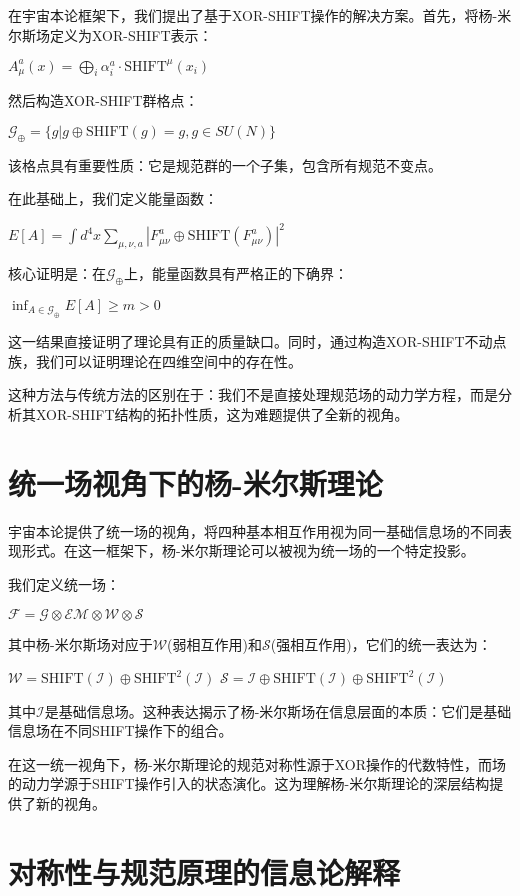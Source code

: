 在宇宙本论框架下，我们提出了基于XOR-SHIFT操作的解决方案。首先，将杨-米尔斯场定义为XOR-SHIFT表示：

$A_{\mu}^a(x) = \bigoplus_{i} \alpha_i^a \cdot \text{SHIFT}^{\mu}(x_i)$

然后构造XOR-SHIFT群格点：

$\mathcal{G}_{\oplus} = \{g | g \oplus \text{SHIFT}(g) = g, g \in SU(N)\}$

该格点具有重要性质：它是规范群的一个子集，包含所有规范不变点。

在此基础上，我们定义能量函数：

$E[A] = \int d^4x \sum_{\mu,\nu,a} |F_{\mu\nu}^a \oplus \text{SHIFT}(F_{\mu\nu}^a)|^2$

核心证明是：在$\mathcal{G}_{\oplus}$上，能量函数具有严格正的下确界：

$\inf_{A \in \mathcal{G}_{\oplus}} E[A] \geq m > 0$

这一结果直接证明了理论具有正的质量缺口。同时，通过构造XOR-SHIFT不动点族，我们可以证明理论在四维空间中的存在性。

这种方法与传统方法的区别在于：我们不是直接处理规范场的动力学方程，而是分析其XOR-SHIFT结构的拓扑性质，这为难题提供了全新的视角。

\section{统一场视角下的杨-米尔斯理论}

宇宙本论提供了统一场的视角，将四种基本相互作用视为同一基础信息场的不同表现形式。在这一框架下，杨-米尔斯理论可以被视为统一场的一个特定投影。

我们定义统一场：

$\mathcal{F} = \mathcal{G} \otimes \mathcal{EM} \otimes \mathcal{W} \otimes \mathcal{S}$

其中杨-米尔斯场对应于$\mathcal{W}$(弱相互作用)和$\mathcal{S}$(强相互作用)，它们的统一表达为：

$\mathcal{W} = \text{SHIFT}(\mathcal{I}) \oplus \text{SHIFT}^2(\mathcal{I})$
$\mathcal{S} = \mathcal{I} \oplus \text{SHIFT}(\mathcal{I}) \oplus \text{SHIFT}^2(\mathcal{I})$

其中$\mathcal{I}$是基础信息场。这种表达揭示了杨-米尔斯场在信息层面的本质：它们是基础信息场在不同SHIFT操作下的组合。

在这一统一视角下，杨-米尔斯理论的规范对称性源于XOR操作的代数特性，而场的动力学源于SHIFT操作引入的状态演化。这为理解杨-米尔斯理论的深层结构提供了新的视角。

\section{对称性与规范原理的信息论解释}


